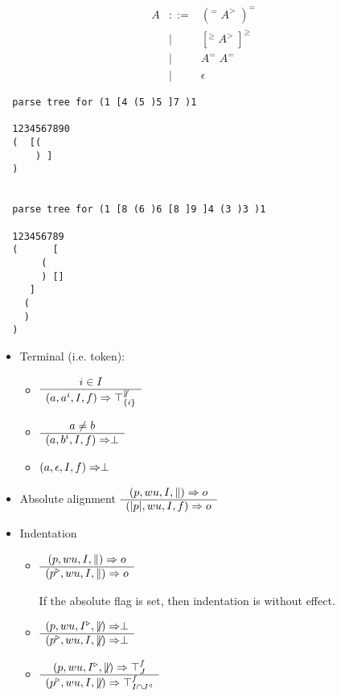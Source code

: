 $$
\begin{array}{lll}
  A &::=& (^= \;  A^> \; )^=
  \\
    &\mid& [^\ge \; A^> \; ]^\ge
  \\
    &\mid& A^= \; A^=
  \\
    &\mid& \epsilon
\end{array}
$$

{\small
\begin{verbatim}
  parse tree for (1 [4 (5 )5 ]7 )1

  1234567890
  (  [(
      ) ]
  )


  parse tree for (1 [8 (6 )6 [8 ]9 ]4 (3 )3 )1

  123456789
  (      [
       (
       ) []
     ]
    (
    )
  )
\end{verbatim}
}




\begin{itemize}

\item Terminal (i.e. token):
  \begin{itemize}
  \item
    $
    \begin{array}{c} i \in I \\ \hline (a,a^i,I,f) \Rightarrow \top_{\{i\}}^{\not\parallel}\end{array}
    $
  \item
    $
    \begin{array}{c} a \ne b \\ \hline (a,b^i,I,f) \Rightarrow \perp\end{array}
    $
  \item
    $
    (a,\epsilon,I,f) \Rightarrow \perp
    $
  \end{itemize}

\item Absolute alignment
  $ \begin{array}{c} (p, wu, I, \parallel) \Rightarrow o  \\ \hline (|p|, wu, I, f) \Rightarrow o\end{array}$


\item Indentation
  \begin{itemize}
  \item
    $
    \begin{array}{c} (p, wu, I, \parallel) \Rightarrow o \\ \hline (p^{\mathrel{\triangleright}}, wu, I, \parallel) \Rightarrow o\end{array}
    $

    If the absolute flag is set, then indentation is without effect.

  \item
    $
    \begin{array}{c} (p, wu, I^{\mathrel{\triangleright}}, {\not\parallel}) \Rightarrow \perp \\ \hline (p^{\mathrel{\triangleright}}, wu, I, {\not\parallel}) \Rightarrow \perp\end{array}
    $

  \item
    $
    \begin{array}{c} (p, wu, I^{\mathrel{\triangleright}}, {\not\parallel}) \Rightarrow \top_J^f \\ \hline (p^{\mathrel{\triangleright}}, wu, I, {\not\parallel}) \Rightarrow \top_{I \cap J^\triangleleft}^f\end{array}
    $
  \end{itemize}
\end{itemize}




